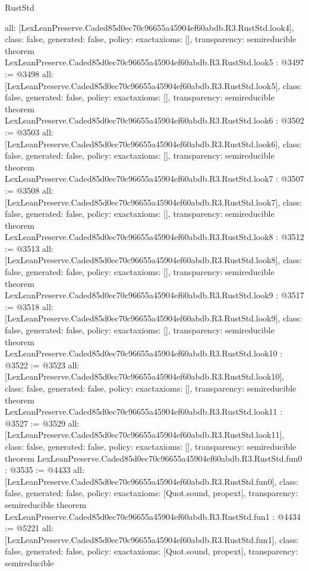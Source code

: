 \begin{lexlean}{RustStd}
\begin{coremodule}
{  all: [LexLeanPreserve.Caded85d0ec70c96655a45904ef60abdb.R3.RustStd.look4],
  class: false,
  generated: false,
  policy: exact{axioms: []},
  transparency: semireducible
}
theorem LexLeanPreserve.Caded85d0ec70c96655a45904ef60abdb.R3.RustStd.look5 : @3497 := @3498 {
  all: [LexLeanPreserve.Caded85d0ec70c96655a45904ef60abdb.R3.RustStd.look5],
  class: false,
  generated: false,
  policy: exact{axioms: []},
  transparency: semireducible
}
theorem LexLeanPreserve.Caded85d0ec70c96655a45904ef60abdb.R3.RustStd.look6 : @3502 := @3503 {
  all: [LexLeanPreserve.Caded85d0ec70c96655a45904ef60abdb.R3.RustStd.look6],
  class: false,
  generated: false,
  policy: exact{axioms: []},
  transparency: semireducible
}
theorem LexLeanPreserve.Caded85d0ec70c96655a45904ef60abdb.R3.RustStd.look7 : @3507 := @3508 {
  all: [LexLeanPreserve.Caded85d0ec70c96655a45904ef60abdb.R3.RustStd.look7],
  class: false,
  generated: false,
  policy: exact{axioms: []},
  transparency: semireducible
}
theorem LexLeanPreserve.Caded85d0ec70c96655a45904ef60abdb.R3.RustStd.look8 : @3512 := @3513 {
  all: [LexLeanPreserve.Caded85d0ec70c96655a45904ef60abdb.R3.RustStd.look8],
  class: false,
  generated: false,
  policy: exact{axioms: []},
  transparency: semireducible
}
theorem LexLeanPreserve.Caded85d0ec70c96655a45904ef60abdb.R3.RustStd.look9 : @3517 := @3518 {
  all: [LexLeanPreserve.Caded85d0ec70c96655a45904ef60abdb.R3.RustStd.look9],
  class: false,
  generated: false,
  policy: exact{axioms: []},
  transparency: semireducible
}
theorem LexLeanPreserve.Caded85d0ec70c96655a45904ef60abdb.R3.RustStd.look10 : @3522 := @3523 {
  all: [LexLeanPreserve.Caded85d0ec70c96655a45904ef60abdb.R3.RustStd.look10],
  class: false,
  generated: false,
  policy: exact{axioms: []},
  transparency: semireducible
}
theorem LexLeanPreserve.Caded85d0ec70c96655a45904ef60abdb.R3.RustStd.look11 : @3527 := @3529 {
  all: [LexLeanPreserve.Caded85d0ec70c96655a45904ef60abdb.R3.RustStd.look11],
  class: false,
  generated: false,
  policy: exact{axioms: []},
  transparency: semireducible
}
theorem LexLeanPreserve.Caded85d0ec70c96655a45904ef60abdb.R3.RustStd.fun0 : @3535 := @4433 {
  all: [LexLeanPreserve.Caded85d0ec70c96655a45904ef60abdb.R3.RustStd.fun0],
  class: false,
  generated: false,
  policy: exact{axioms: [Quot.sound, propext]},
  transparency: semireducible
}
theorem LexLeanPreserve.Caded85d0ec70c96655a45904ef60abdb.R3.RustStd.fun1 : @4434 := @5221 {
  all: [LexLeanPreserve.Caded85d0ec70c96655a45904ef60abdb.R3.RustStd.fun1],
  class: false,
  generated: false,
  policy: exact{axioms: [Quot.sound, propext]},
  transparency: semireducible
}
\end{coremodule}
\end{lexlean}
